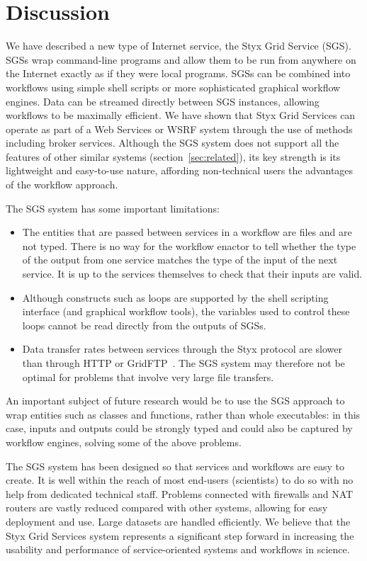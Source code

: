 \documentclass[a4paper]{article}
\begin{document}
\section{Discussion}

We have described a new type of Internet service, the Styx Grid Service (SGS).  SGSs wrap command-line programs and allow them to be run from anywhere on the Internet exactly as if they were local programs.  SGSs can be combined into workflows using simple shell scripts or more sophisticated graphical workflow engines.  Data can be streamed directly between SGS instances, allowing workflows to be maximally efficient.  We have shown that Styx Grid Services can operate as part of a Web Services or WSRF system through the use of methods including broker services.  Although the SGS system does not support all the features of other similar systems (section~\ref{sec:related}), its key strength is its lightweight and easy-to-use nature, affording non-technical users the advantages of the workflow approach.

The SGS system has some important limitations:

\begin{itemize}
	\item The entities that are passed between services in a workflow are files and are not typed.  There is no way for the workflow enactor to tell whether the type of the output from one service matches the type of the input of the next service.  It is up to the services themselves to check that their inputs are valid.
	\item Although constructs such as loops are supported by the shell scripting interface (and graphical workflow tools), the variables used to control these loops cannot be read directly from the outputs of SGSs.
	\item Data transfer rates between services through the Styx protocol are slower than through HTTP or GridFTP~\cite{blower:2005}.  The SGS system may therefore not be optimal for problems that involve very large file transfers.
\end{itemize}

An important subject of future research would be to use the SGS approach to wrap entities such as classes and functions, rather than whole executables: in this case, inputs and outputs could be strongly typed and could also be captured by workflow engines, solving some of the above problems.

The SGS system has been designed so that services and workflows are easy to create.  It is well within the reach of most end-users (scientists) to do so with no help from dedicated technical staff.  Problems connected with firewalls and NAT routers are vastly reduced compared with other systems, allowing for easy deployment and use.  Large datasets are handled efficiently.  We believe that the Styx Grid Services system represents a significant step forward in increasing the usability and performance of service-oriented systems and workflows in science.
%
\end{document}
